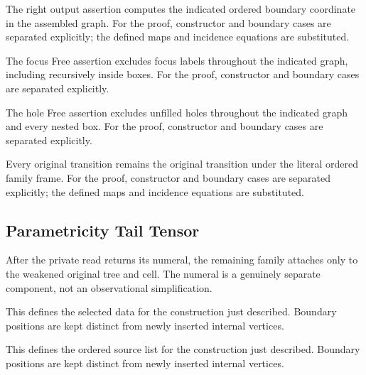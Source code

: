 The right output assertion computes the indicated ordered boundary coordinate in the assembled graph.
For the proof, constructor and boundary cases are separated explicitly; the defined maps and incidence equations are substituted.
\par{}

The focus Free assertion excludes focus labels throughout the indicated graph, including recursively inside boxes.
For the proof, constructor and boundary cases are separated explicitly.
\par{}

The hole Free assertion excludes unfilled holes throughout the indicated graph and every nested box.
For the proof, constructor and boundary cases are separated explicitly.
\par{}

Every original transition remains the original transition under the literal ordered family frame.
For the proof, constructor and boundary cases are separated explicitly; the defined maps and incidence equations are substituted.
\par{}

\subsection{Parametricity Tail Tensor}
After the private read returns its numeral, the remaining family attaches only to the weakened original tree and cell. The numeral is a genuinely separate component, not an observational simplification.

This defines the selected data for the construction just described. Boundary positions are kept distinct from newly inserted internal vertices.
\par{}

This defines the ordered source list for the construction just described. Boundary positions are kept distinct from newly inserted internal vertices.
\par{}

